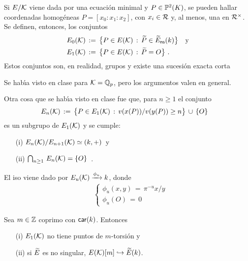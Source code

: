 Si $E/\cal{K}$ viene dada por una ecuaci\'{o}n minimal y $P\in\bb{P}^{2}(K)$,
se pueden hallar coordenadas homog\'{e}neas $P=[x_{0}:x_{1}:x_{2}]$, con
$x_{i}\in\cal{R}$ y, al menos, una en $\cal{R}^{\times}$. Se definen, entonces,
los conjuntos
\begin{align*}
	E_{0}(\cal{K}) & \,:=\,\big\{P\in E(\cal{K})\,:\,
		\reducido{P}\in\redns{E}(k)\big\} \quad\text{y} \\
	E_{1}(\cal{K}) & \,:=\,\big\{P\in E(\cal{K})\,:\,
		\reducido{P}=O\big\}
	\text{ .}
\end{align*}
%
Estos conjuntos son, en realidad, grupos y existe una sucesi\'{o}n exacta corta
\begin{center}
\end{center}
Se hab\'{\i}a visto en clase para $\cal{K}=\bb{Q}_{p}$, pero los argumentos
valen en general.

Otra cosa que se hab\'{\i}a visto en clase fue que, para $n\geq 1$ el conjunto
\begin{align*}
	E_{n}(\cal{K}) & \,:=\,\big\{P\in E_{1}(\cal{K})\,:\,
		v(x(P))/v(y(P))\geq n\big\}\,\cup\,\{O\}
\end{align*}
%
es un subgrupo de $E_{1}(\cal{K})$ y se cumple:
\begin{itemize}
	\item[(i)]
		\begin{math}
			E_{n}(\cal{K})/E_{n+1}(\cal{K})\simeq (k,+)
		\end{math}~y
	\item[(ii)]
		\begin{math}
			\bigcap_{n\geq 1}\,E_{n}(\cal{K})=\{O\}
		\end{math}~.
\end{itemize}
%
El iso viene dado por $E_{u}(\cal{K})\xrightarrow{\phi_{u}}k$, donde
\begin{align*}
	&
	\begin{cases}
		\phi_{u}(x,y) \,=\,\pi^{-u}x/y \\
		\phi_{u}(O) \,=\,0
	\end{cases}
\end{align*}
%

\begin{propoReduccionYTorsion}\label{propo:reduccionytorsion}
	Sea $m\in\bb{Z}$ coprimo con $\char k$. Entonces
	\begin{itemize}
		\item[(i)] $E_{1}(\cal{K})$ no tiene puntos de $m$-torsi\'{o}n
			y
		\item[(ii)] si $\reducido{E}$ es no singular,
			$E(\cal{K})[m]\hookrightarrow\reducido{E}(k)$.
	\end{itemize}
\end{propoReduccionYTorsion}

